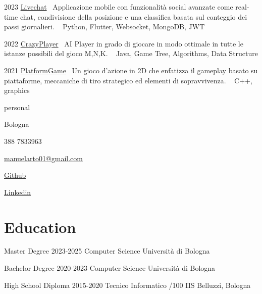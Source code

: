 \documentclass{tccv}
\begin{document}
\begin{yearlist}

\item{2023}
     {\href{https://github.com/manuelarto/livechat}{Livechat}}
     {\textbullet~Applicazione mobile con funzionalità social avanzate come real-time chat, condivisione della posizione e una classifica basata sul conteggio dei passi giornalieri. \newline
    \textbullet~ Python, Flutter, Websocket, MongoDB, JWT}
\item{2022}
     {\href{https://github.com/manuelarto/crazyplayer}{CrazyPlayer}}
     {\textbullet~AI Player in grado di giocare in modo ottimale in tutte le istanze possibili del gioco M,N,K. \newline
    \textbullet~ Java, Game Tree, Algorithms, Data Structure}
\item{2021}
     {\href{https://github.com/manuelarto/platformgame}{PlatformGame}}
     {\textbullet~Un gioco d'azione in 2D che enfatizza il gameplay basato su piattaforme, meccaniche di tiro strategico ed elementi di sopravvivenza. \newline
    \textbullet~ C++, graphics}

\end{yearlist}


\begin{keyvaluelist}{personal}
    \item[\faHome] Bologna
    \item[\faPhone] 388 7833963
    \item[\faEnvelope] \href{mailto:my@email.address}{manuelarto01@gmail.com}
    \item[\faGithub] \href{https://github.com/manuelarto}{Github}
    \item[\faLinkedin] \href{https://www.linkedin.com/in/manuel-arto-696012203/}{Linkedin}
\end{keyvaluelist}


\section{Education}

\begin{yearlist}

\item[Master Degree]{2023-2025}
     {Computer Science}
     {Università di Bologna}

\item[Bachelor Degree]{2020-2023}
    {Computer Science}
    {Università di Bologna}

\item[High School Diploma]{2015-2020}
    {Tecnico Informatico /100}
    {IIS Belluzzi, Bologna}

\end{yearlist}
\end{document}
